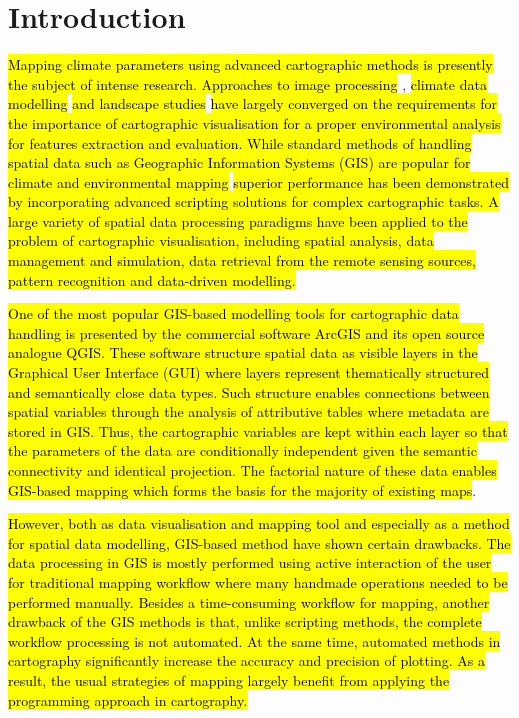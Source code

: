 \documentclass[ijgi,article,submit,pdftex,moreauthors]{Definitions/mdpi}
\begin{document}
\section{Introduction}

\hl{Mapping climate parameters using advanced cartographic methods is presently the subject of intense research. Approaches to image processing} \cite{Turner,Hamandawana}, \hl{climate data modelling} \cite{MaoyiAbiodun} \hl{and landscape studies} \cite{Segobye} \hl{have largely converged on the requirements for the importance of cartographic visualisation for a proper environmental analysis for features extraction and evaluation. While standard methods of handling spatial data such as Geographic Information Systems (GIS) are popular for climate and environmental mapping} \cite{Ceccato,Sherbinin,Herslund} \hl{superior performance has been demonstrated by incorporating advanced scripting solutions for complex cartographic tasks. A large variety of spatial data processing paradigms have been applied to the problem of cartographic visualisation, including spatial analysis, data management and simulation, data retrieval from the remote sensing sources, pattern recognition and data-driven modelling. }

\hl{One of the most popular GIS-based modelling tools for cartographic data handling is presented by the commercial software ArcGIS and its open source analogue QGIS. These software structure spatial data as visible layers in the Graphical User Interface (GUI) where layers represent thematically structured and semantically close data types. Such structure enables connections between spatial variables through the analysis of attributive tables where metadata are stored in GIS. Thus, the cartographic variables are kept within each layer so that the parameters of the data are conditionally independent given the semantic connectivity and identical projection. The factorial nature of these data enables GIS-based mapping which forms the basis for the majority of existing maps}. 

\hl{However, both as data visualisation and mapping tool and especially as a method for spatial data modelling, GIS-based method have shown certain drawbacks. The data processing in GIS is mostly performed using active interaction of the user for traditional mapping workflow where many handmade operations needed to be performed manually. Besides a time-consuming workflow for mapping, another drawback of the GIS methods is that, unlike scripting methods, the complete workflow processing is not automated. At the same time, automated methods in cartography significantly increase the accuracy and precision of plotting. As a result, the usual strategies of mapping largely benefit from applying the programming approach in cartography.}
\end{document}
